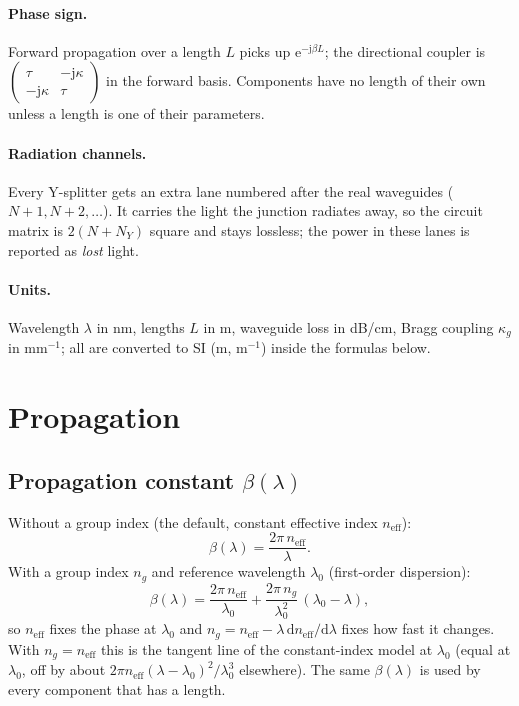 \documentclass[10pt,a4paper]{article}
\newcommand{\jj}{\mathrm{j}}
\newcommand{\e}{\mathrm{e}}
\newcommand{\dd}{\mathrm{d}}
\begin{document}
\paragraph{Phase sign.} Forward propagation over a length $L$ picks up $\e^{-\jj\beta L}$; the directional coupler is
$\left(\begin{smallmatrix}\tau & -\jj\kappa\\ -\jj\kappa & \tau\end{smallmatrix}\right)$ in the forward basis. Components have no length of
their own unless a length is one of their parameters.

\paragraph{Radiation channels.} Every Y-splitter gets an extra lane numbered after the real waveguides
($N+1, N+2,\dots$). It carries the light the junction radiates away, so the circuit matrix is $2(N+N_Y)$ square and stays
lossless; the power in these lanes is reported as \emph{lost} light.

\paragraph{Units.} Wavelength $\lambda$ in nm, lengths $L$ in \textmu m, waveguide loss in dB/cm, Bragg coupling $\kappa_g$ in
mm$^{-1}$; all are converted to SI (m, m$^{-1}$) inside the formulas below.

\section{Propagation}

\subsection{Propagation constant $\beta(\lambda)$}
Without a group index (the default, constant effective index $n_{\text{eff}}$):
\[
  \beta(\lambda) = \frac{2\pi\, n_{\text{eff}}}{\lambda}.
\]
With a group index $n_g$ and reference wavelength $\lambda_0$ (first-order dispersion):
\[
  \beta(\lambda) = \frac{2\pi\, n_{\text{eff}}}{\lambda_0} + \frac{2\pi\, n_g}{\lambda_0^{2}}\,(\lambda_0-\lambda),
\]
so $n_{\text{eff}}$ fixes the phase at $\lambda_0$ and $n_g = n_{\text{eff}} - \lambda\,\dd n_{\text{eff}}/\dd\lambda$ fixes
how fast it changes. With $n_g = n_{\text{eff}}$ this is the tangent line of the constant-index model at $\lambda_0$
(equal at $\lambda_0$, off by about $2\pi n_{\text{eff}}(\lambda-\lambda_0)^2/\lambda_0^3$ elsewhere). The same $\beta(\lambda)$ is used by
every component that has a length.
\end{document}
